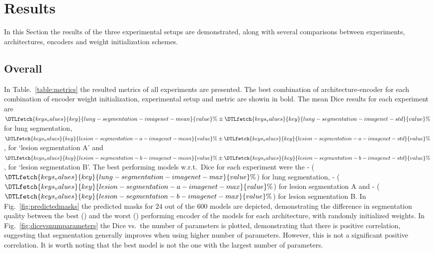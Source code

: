 \documentclass[journal]{IEEEtran}
\begin{document}
\section{Results}
\label{sec:results}
In this Section the results of the three experimental setups are demonstrated, along with several comparisons between experiments, architectures, encoders and weight initialization schemes.

\subsection{Overall}
In Table.~\ref{table:metrics} the resulted metrics of all experiments are presented.
The best combination of architecture-encoder for each combination of encoder weight initialization, experimental setup and metric are showin in bold.
The mean Dice results for each experiment are $\DTLfetch{keys_values}{key}{lung-segmentation-imagenet-mean}{value}\%\pm\DTLfetch{keys_values}{key}{lung-segmentation-imagenet-std}{value}\%$ for lung segmentation, $\DTLfetch{keys_values}{key}{lesion-segmentation-a-imagenet-mean}{value}\%\pm\DTLfetch{keys_values}{key}{lesion-segmentation-a-imagenet-std}{value}\%$, for `lesion segmentation A' and $\DTLfetch{keys_values}{key}{lesion-segmentation-b-imagenet-mean}{value}\%\pm\DTLfetch{keys_values}{key}{lesion-segmentation-b-imagenet-std}{value}\%$, for `lesion segmentation B'.
The best performing models w.r.t.\ Dice for each experiment were the - ($\DTLfetch{keys_values}{key}{lung-segmentation-imagenet-max}{value}\%$) for lung segmentation, - ($\DTLfetch{keys_values}{key}{lesion-segmentation-a-imagenet-max}{value}\%$) for lesion segmentation A and - ($\DTLfetch{keys_values}{key}{lesion-segmentation-b-imagenet-max}{value}\%$) for lesion segmentation B.
In Fig.~\ref{fig:predictedmasks} the predicted masks for $24$ out of the $600$ models are depicted, demonstrating the difference in segmentation quality between the best () and the worst () performing encoder of the models for each architecture, with randomly initialized weights.
In Fig.~\ref{fig:dicevsnumparameters} the Dice vs.\ the number of parameters is plotted, demonstrating that there is positive correlation, suggesting that segmentation generally improves when using higher number of parameters.
However, this is not a significant positive correlation.
It is worth noting that the best model is not the one with the largest number of parameters.
\end{document}
